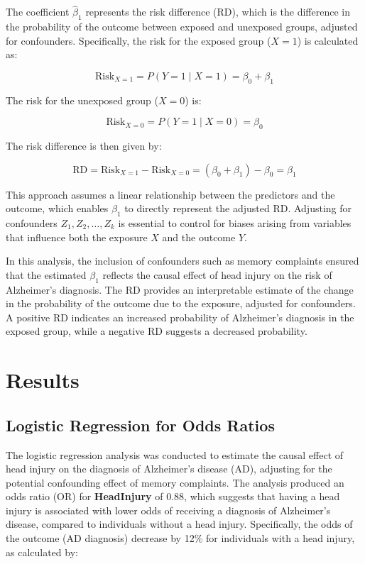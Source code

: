 \documentclass[12pt]{article}
\begin{document}
The coefficient \( \hat{\beta}_1 \) represents the risk difference (RD), which is the difference in the probability of the outcome between exposed and unexposed groups, adjusted for confounders. Specifically, the risk for the exposed group (\( X = 1 \)) is calculated as:

\[
\text{Risk}_{X=1} = P(Y = 1 \mid X = 1) = \beta_0 + \beta_1
\]

The risk for the unexposed group (\( X = 0 \)) is:

\[
\text{Risk}_{X=0} = P(Y = 1 \mid X = 0) = \beta_0
\]

The risk difference is then given by:

\[
\text{RD} = \text{Risk}_{X=1} - \text{Risk}_{X=0} = (\beta_0 + \beta_1) - \beta_0 = \beta_1
\]

This approach assumes a linear relationship between the predictors and the outcome, which enables \( \beta_1 \) to directly represent the adjusted RD. Adjusting for confounders \( Z_1, Z_2, \dots, Z_k \) is essential to control for biases arising from variables that influence both the exposure \( X \) and the outcome \( Y \).

In this analysis, the inclusion of confounders such as memory complaints ensured that the estimated \( \beta_1 \) reflects the causal effect of head injury on the risk of Alzheimer's diagnosis. The RD provides an interpretable estimate of the change in the probability of the outcome due to the exposure, adjusted for confounders. A positive RD indicates an increased probability of Alzheimer's diagnosis in the exposed group, while a negative RD suggests a decreased probability.



\section{Results}
\subsection{Logistic Regression for Odds Ratios}

The logistic regression analysis was conducted to estimate the causal effect of head injury on the diagnosis of Alzheimer's disease (AD), adjusting for the potential confounding effect of memory complaints. The analysis produced an odds ratio (OR) for \textbf{HeadInjury} of 0.88, which suggests that having a head injury is associated with lower odds of receiving a diagnosis of Alzheimer's disease, compared to individuals without a head injury. Specifically, the odds of the outcome (AD diagnosis) decrease by 12\% for individuals with a head injury, as calculated by:
\end{document}
